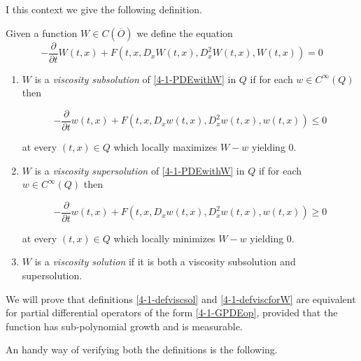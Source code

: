 I this context we give the following definition.

\begin{definition}\label{4-1-defviscforW}
    Given a function $W\in C(\overline{O})$ we define the equation
    \begin{equation}\label{4-1-PDEwithW}
        -\frac{\partial}{\partial t}W(t,x) + F(t,x,D_xW(t,x),D_x^2W(t,x),W(t,x))=0
    \end{equation}

    \begin{enumerate}[label=(\alph*)]
        \item $W$ is a \textit{viscosity subsolution} of \ref{4-1-PDEwithW} in $Q$ if for each $w\in C^{\infty}(Q)$ then 
        
        \begin{equation}
            -\frac{\partial}{\partial t}w(t,x) + F(t,x,D_xw(t,x),D_x^2w(t,x),w(t,x))\leq0
        \end{equation}

        at every $(t,x)\in Q$ which locally maximizes $W-w$ yielding $0$.
        
        \item $W$ is a \textit{viscosity supersolution} of \ref{4-1-PDEwithW} in $Q$ if for each $w\in C^{\infty}(Q)$ then 
        
        \begin{equation}
            -\frac{\partial}{\partial t}w(t,x) + F(t,x,D_xw(t,x),D_x^2w(t,x),w(t,x))\geq0
        \end{equation}

        at every $(t,x)\in Q$ which locally minimizes $W-w$ yielding $0$.

        \item $W$ is a \textit{viscosity solution} if it is both a viscosity subsolution and supersolution.
    \end{enumerate}
\end{definition}

We will prove that definitions \ref{4-1-defviscsol} and \ref{4-1-defviscforW} are equivalent for partial differential operators 
of the form \ref{4-1-GPDEop}, provided that the function has sub-polynomial growth and is measurable.

An handy way of verifying both the definitions is the following.

